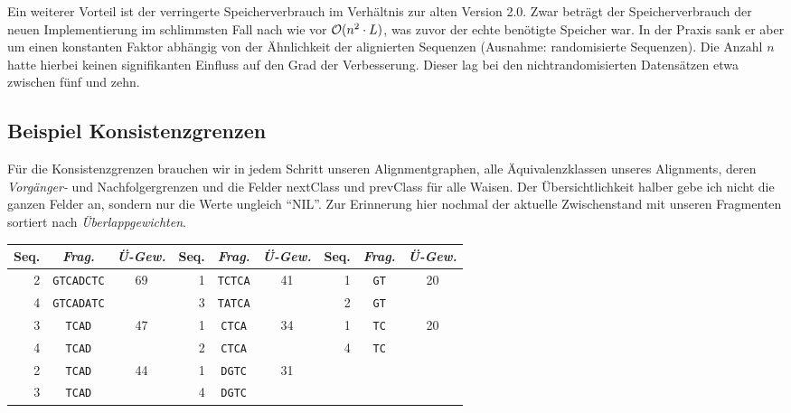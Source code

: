 Ein weiterer Vorteil ist der verringerte Speicherverbrauch im Verhältnis zur alten Version 2.0. Zwar beträgt der Speicherverbrauch der neuen Implementierung im schlimmsten Fall nach wie vor $\mathcal{O}(n^2\cdot L)$, was zuvor der echte benötigte Speicher war. In der Praxis sank er aber um einen konstanten Faktor abhängig von der Ähnlichkeit der alignierten Sequenzen (Ausnahme: randomisierte Sequenzen). Die Anzahl $n$ hatte hierbei keinen signifikanten Einfluss auf den Grad der Verbesserung. Dieser lag bei den nichtrandomisierten Datensätzen etwa zwischen fünf und zehn.

\subsection{Beispiel Konsistenzgrenzen}

Für die Konsistenzgrenzen brauchen wir in jedem Schritt unseren Alignmentgraphen, alle Äquivalenzklassen unseres Alignments, deren \emph{Vorgänger-} und Nachfolgergrenzen und die Felder \textrm{nextClass} und \textrm{prevClass} für alle  Waisen. Der Übersichtlichkeit halber gebe ich nicht die ganzen Felder an, sondern nur die Werte ungleich \enquote{NIL}. Zur Erinnerung hier nochmal der aktuelle Zwischenstand mit unseren Fragmenten sortiert nach \emph{Überlappgewichten}.

\begin{tabular}{r|c|c||r|c|c||r|c|c}
	Seq. & \emph{Frag.} & \emph{Ü-Gew.} & Seq. & \emph{Frag.} & \emph{Ü-Gew.} & Seq. & \emph{Frag.} & \emph{Ü-Gew.}\\
	\hline
	2 & \texttt{GTCADCTC} & \multirow{2}{*}{69} & 1 & \texttt{TCTCA} & \multirow{2}{*}{41} & 1 & \texttt{GT} &\multirow{2}{*}{20} \\
	4 & \texttt{GTCADATC} &                     & 3 & \texttt{TATCA} &                     & 2 & \texttt{GT} & \\
	3 & \texttt{TCAD} & \multirow{2}{*}{47} & 1 & \texttt{CTCA} & \multirow{2}{*}{34} & 1 & \texttt{TC} & \multirow{2}{*}{20} \\
	4 & \texttt{TCAD} &                     & 2 & \texttt{CTCA} &                          & 4 & \texttt{TC} & \\
	2 & \texttt{TCAD} & \multirow{2}{*}{44} & 1 & \texttt{DGTC} & \multirow{2}{*}{31} &    &   & \\
	3 & \texttt{TCAD} &                     & 4 & \texttt{DGTC} &                     &    &   & \\
\end{tabular}

